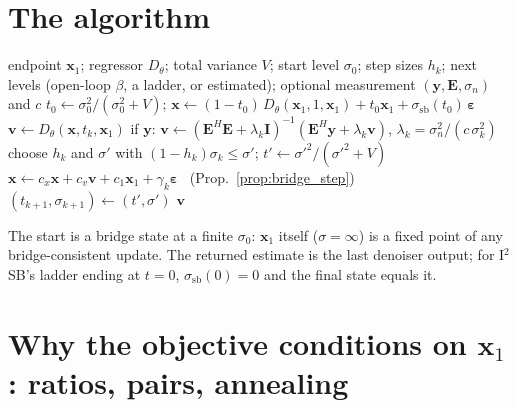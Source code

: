\documentclass[11pt]{article}
\theoremstyle{definition}
\theoremstyle{remark}
\newcommand{\x}{\bm{x}}
\newcommand{\y}{\bm{y}}
\newcommand{\uu}{\bm{u}}
\newcommand{\vv}{\bm{v}}
\newcommand{\eps}{\bm{\varepsilon}}
\newcommand{\Id}{\bm{I}}
\newcommand{\Op}{\bm{E}}
\newcommand{\D}{D_\theta}
\newcommand{\ssb}{\sigma_{\mathrm{sb}}}
\newcommand{\grad}{\nabla}
\newcommand{\code}[1]{\texttt{#1}}
\begin{document}
\section{The algorithm}

\begin{algorithm}[H]
\caption{ImMAP-SB: annealed gradient ascent on the bridge
         (\code{sb/immap\_sb\_ascent.py}, \code{immap\_sb\_ascent})}
\label{alg:immap_sb}
\begin{algorithmic}[1]
\Require endpoint $\x_1$; regressor $\D$; total variance $V$; start level $\sigma_0$;
         step sizes $h_k$; next levels (open-loop $\beta$, a ladder, or estimated); optional
         measurement $(\y,\Op,\sigma_n)$ and $c$
\State $t_0 \gets \sigma_0^2/(\sigma_0^2+V)$;\quad
       $\x \gets (1-t_0)\,\D(\x_1, 1, \x_1) + t_0\x_1 + \ssb(t_0)\,\eps$
  \State $\vv \gets \D(\x, t_k, \x_1)$
         \Comment{$\sigma_k^2\grad J_{\sigma_k} = \vv - \uu$ (Prop.~\ref{prop:tweedie})}
  \State if $\y$: $\vv \gets (\Op^H\Op + \lambda_k\Id)^{-1}(\Op^H\y + \lambda_k\vv)$,
         $\lambda_k = \sigma_n^2/(c\,\sigma_k^2)$
  \State choose $h_k$ and $\sigma'$ with $(1-h_k)\sigma_k\le\sigma'$;\quad
         $t' \gets \sigma'^2/(\sigma'^2+V)$
  \State $\x \gets c_x\x + c_v\vv + c_1\x_1 + \gamma_k\eps$ \ (Prop.~\ref{prop:bridge_step})
  \State $(t_{k+1},\sigma_{k+1}) \gets (t',\sigma')$
\EndFor
\State \Return $\vv$
\end{algorithmic}
\end{algorithm}

\noindent The start is a bridge state at a finite $\sigma_0$: $\x_1$ itself ($\sigma=\infty$) is
a fixed point of any bridge-consistent update. The returned estimate is the last denoiser
output; for I$^2$SB's ladder ending at $t=0$, $\ssb(0)=0$ and the final state equals it.

\section{Why the objective conditions on \texorpdfstring{$\x_1$}{x1}: ratios, pairs, annealing}\label{sec:pairs}
\end{document}
